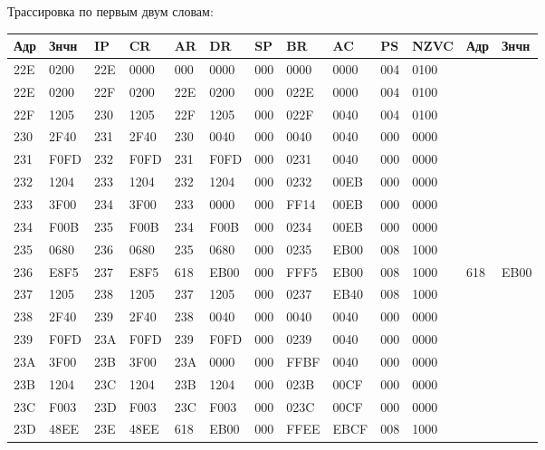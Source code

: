 Трассировка по первым двум словам:
\begin{table}[!ht]
  \centering
  \begin{tabular}{|l|l|l|l|l|l|l|l|l|l|l|l|l|}
  \hline
      Адр & Знчн & IP & CR & AR & DR & SP & BR & AC & PS & NZVC & Адр & Знчн \\ \hline
      22E & 0200 & 22E & 0000 & 000 & 0000 & 000 & 0000 & 0000 & 004 & 0100 & ~ & ~ \\ \hline
      22E & 0200 & 22F & 0200 & 22E & 0200 & 000 & 022E & 0000 & 004 & 0100 & ~ & ~ \\ \hline
      22F & 1205 & 230 & 1205 & 22F & 1205 & 000 & 022F & 0040 & 004 & 0100 & ~ & ~ \\ \hline
      230 & 2F40 & 231 & 2F40 & 230 & 0040 & 000 & 0040 & 0040 & 000 & 0000 & ~ & ~ \\ \hline
      231 & F0FD & 232 & F0FD & 231 & F0FD & 000 & 0231 & 0040 & 000 & 0000 & ~ & ~ \\ \hline
      232 & 1204 & 233 & 1204 & 232 & 1204 & 000 & 0232 & 00EB & 000 & 0000 & ~ & ~ \\ \hline
      233 & 3F00 & 234 & 3F00 & 233 & 0000 & 000 & FF14 & 00EB & 000 & 0000 & ~ & ~ \\ \hline
      234 & F00B & 235 & F00B & 234 & F00B & 000 & 0234 & 00EB & 000 & 0000 & ~ & ~ \\ \hline
      235 & 0680 & 236 & 0680 & 235 & 0680 & 000 & 0235 & EB00 & 008 & 1000 & ~ & ~ \\ \hline
      236 & E8F5 & 237 & E8F5 & 618 & EB00 & 000 & FFF5 & EB00 & 008 & 1000 & 618 & EB00 \\ \hline
      237 & 1205 & 238 & 1205 & 237 & 1205 & 000 & 0237 & EB40 & 008 & 1000 & ~ & ~ \\ \hline
      238 & 2F40 & 239 & 2F40 & 238 & 0040 & 000 & 0040 & 0040 & 000 & 0000 & ~ & ~ \\ \hline
      239 & F0FD & 23A & F0FD & 239 & F0FD & 000 & 0239 & 0040 & 000 & 0000 & ~ & ~ \\ \hline
      23A & 3F00 & 23B & 3F00 & 23A & 0000 & 000 & FFBF & 0040 & 000 & 0000 & ~ & ~ \\ \hline
      23B & 1204 & 23C & 1204 & 23B & 1204 & 000 & 023B & 00CF & 000 & 0000 & ~ & ~ \\ \hline
      23C & F003 & 23D & F003 & 23C & F003 & 000 & 023C & 00CF & 000 & 0000 & ~ & ~ \\ \hline
      23D & 48EE & 23E & 48EE & 618 & EB00 & 000 & FFEE & EBCF & 008 & 1000 & ~ & ~ \\ \hline

\end{tabular}
\end{table}
